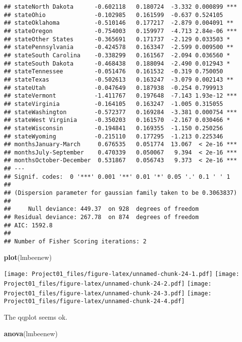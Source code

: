 \documentclass[
]{article}
\newenvironment{Shaded}{\begin{snugshade}}{\end{snugshade}}
\newcommand{\FunctionTok}[1]{\textcolor[rgb]{0.13,0.29,0.53}{\textbf{#1}}}
\newcommand{\NormalTok}[1]{#1}
\begin{document}
\begin{verbatim}
## stateNorth Dakota      -0.602118   0.180724  -3.332 0.000899 ***
## stateOhio              -0.102985   0.161599  -0.637 0.524105    
## stateOklahoma          -0.510146   0.177217  -2.879 0.004091 ** 
## stateOregon            -0.754003   0.159977  -4.713 2.84e-06 ***
## stateOther States      -0.365691   0.171737  -2.129 0.033503 *  
## statePennsylvania      -0.424578   0.163347  -2.599 0.009500 ** 
## stateSouth Carolina    -0.338299   0.161567  -2.094 0.036560 *  
## stateSouth Dakota      -0.468438   0.188094  -2.490 0.012943 *  
## stateTennessee         -0.051476   0.161532  -0.319 0.750050    
## stateTexas             -0.502613   0.163247  -3.079 0.002143 ** 
## stateUtah              -0.047649   0.187938  -0.254 0.799913    
## stateVermont           -1.411767   0.197648  -7.143 1.93e-12 ***
## stateVirginia          -0.164105   0.163247  -1.005 0.315055    
## stateWashington        -0.572377   0.169284  -3.381 0.000754 ***
## stateWest Virginia     -0.350203   0.161570  -2.167 0.030466 *  
## stateWisconsin         -0.194841   0.169355  -1.150 0.250256    
## stateWyoming           -0.215110   0.177295  -1.213 0.225346    
## monthsJanuary-March     0.676535   0.051774  13.067  < 2e-16 ***
## monthsJuly-September    0.470339   0.050067   9.394  < 2e-16 ***
## monthsOctober-December  0.531867   0.056743   9.373  < 2e-16 ***
## ---
## Signif. codes:  0 '***' 0.001 '**' 0.01 '*' 0.05 '.' 0.1 ' ' 1
## 
## (Dispersion parameter for gaussian family taken to be 0.3063837)
## 
##     Null deviance: 449.37  on 928  degrees of freedom
## Residual deviance: 267.78  on 874  degrees of freedom
## AIC: 1592.8
## 
## Number of Fisher Scoring iterations: 2
\end{verbatim}

\begin{Shaded}
\begin{Highlighting}[]
\FunctionTok{plot}\NormalTok{(lmbeenew)}
\end{Highlighting}
\end{Shaded}

\texttt{[image: Project01\_files/figure-latex/unnamed-chunk-24-1.pdf]}
\texttt{[image: Project01\_files/figure-latex/unnamed-chunk-24-2.pdf]}
\texttt{[image: Project01\_files/figure-latex/unnamed-chunk-24-3.pdf]}
\texttt{[image: Project01\_files/figure-latex/unnamed-chunk-24-4.pdf]}

The qqplot seems ok.

\begin{Shaded}
\begin{Highlighting}[]
\FunctionTok{anova}\NormalTok{(lmbeenew)}
\end{Highlighting}
\end{Shaded}
\end{document}
